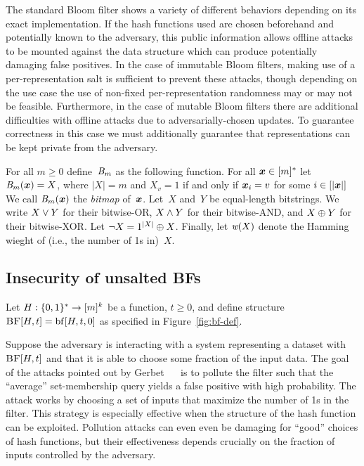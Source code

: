 %
The standard Bloom filter shows a variety of different behaviors depending on
its exact implementation. If the hash functions used are chosen beforehand and
potentially known to the adversary, this public information allows offline
attacks to be mounted against the data structure which can produce potentially
damaging false positives. In the case of immutable Bloom filters, making use of
a per-representation salt is sufficient to prevent these attacks, though
depending on the use case the use of non-fixed per-representation randomness may
or may not be feasible. Furthermore, in the case of mutable Bloom filters there
are additional difficulties with offline attacks due to adversarially-chosen
updates. To guarantee correctness in this case we must additionally guarantee
that representations can be kept private from the adversary.

%
%
For all $m\geq0$ define~$\textit{B}_m$ as the following function.
For all $\v.x\in[m]^*$ let $\bmap_m(\v.x) = X$, where
$|X|=m$ and $X_v=1$ if and only if $\v.x_i = v$ for some $i\in[|\v.x|]$
%
We call $\bmap_m(\v.x)$ the \emph{bitmap} of~$\v.x$.
%
Let~$X$ and~$Y$ be equal-length bitstrings. We write $X \vee Y$ for their
bitwise-OR, $X \wedge Y$ for their bitwise-AND, and $X \mathbin{\oplus} Y$ for their
bitwise-XOR. Let $\neg X = 1^{|X|} \mathbin{\oplus} X$.
%
Finally, let $\textit{w}(X)$ denote the Hamming wieght of (i.e., the number of 1s in)~$X$.

\subsection{Insecurity of unsalted BFs}
Let $H:\{0,1\}^*\to[m]^k$ be a function, $t\geq0$, and define structure $\textnormal{\textsc{BF}}[H,t] =
\mathrm{bf}[H,t,0]$ as specified in Figure~\ref{fig:bf-def}.

%
Suppose the adversary is interacting with a system representing a dataset with
$\textnormal{\textsc{BF}}[H,t]$ and that it is able to choose some fraction of the input data.
%
%
The goal of the attacks pointed out by Gerbet \etal~~\cite{gerbet2015power} is
to pollute the filter such that the ``average'' set-membership query yields a
false positive with high probability. The attack works by choosing a set of
inputs that maximize the number of 1s in the filter. This strategy is especially
effective when the structure of the hash function can be exploited.
%
%
Pollution attacks can even even be damaging for ``good'' choices of hash
functions, but their effectiveness depends crucially on the fraction of inputs
controlled by the adversary.
%

